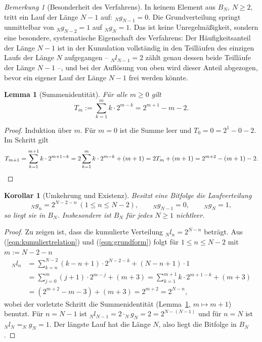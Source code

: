 \documentclass[11pt,a4paper]{scrartcl}
\theoremstyle{plain}
\newtheorem{lemma}[satz]{Lemma}
\newtheorem{korollar}[satz]{Korollar}
\theoremstyle{definition}
\theoremstyle{remark}
\newtheorem{bem}[satz]{Bemerkung}
\begin{document}
\begin{bem}[Besonderheit des Verfahrens]\label{bem:keinlaufnminus1}
In keinem Element aus $B_N$, $N\geq 2$, tritt ein Lauf der Länge $N-1$
auf: $_Ng_{N-1}=0$. Die Grundverteilung springt unmittelbar von
$_Ng_{N-2}=1$ auf $_Ng_N=1$. Das ist keine Unregelmäßigkeit, sondern
eine besondere, systematische Eigenschaft des Verfahrens: Der
Häufigkeitsanteil der Länge $N-1$ ist in der Kumulation vollständig in
den Teilläufen des einzigen Laufs der Länge $N$ aufgegangen --
$_Nl_{N-1}=2$ zählt genau dessen beide Teilläufe der Länge $N-1$ --,
und bei der Auflösung von oben wird dieser Anteil abgezogen, bevor ein
eigener Lauf der Länge $N-1$ frei werden könnte.
\end{bem}

\begin{lemma}[Summenidentität]\label{lem:summenidentitaet}
Für alle $m\geq 0$ gilt
\begin{equation}\label{eqn:summenidentitaet}
  T_m:=\sum_{k=1}^{m} k\cdot 2^{m-k}=2^{m+1}-m-2.
\end{equation}
\end{lemma}

\begin{proof}
Induktion über $m$. Für $m=0$ ist die Summe leer und
$T_0=0=2^{1}-0-2$. Im Schritt gilt
\begin{equation*}
  T_{m+1}=\sum_{k=1}^{m+1}k\cdot 2^{m+1-k}
  =2\sum_{k=1}^{m}k\cdot 2^{m-k}+(m+1)
  =2T_m+(m+1)
  =2^{m+2}-(m+1)-2.\qedhere
\end{equation*}
\end{proof}

\begin{korollar}[Umkehrung und Existenz]\label{kor:umkehrung}
Besitzt eine Bitfolge die Laufverteilung
\begin{equation}\label{eqn:grundform}
  _Ng_n=2^{N-2-n}\ (1\leq n\leq N-2),\qquad _Ng_{N-1}=0,\qquad _Ng_N=1,
\end{equation}
so liegt sie in $B_N$. Insbesondere ist $B_N$ für jedes $N\geq 1$
nichtleer.
\end{korollar}

\begin{proof}
Zu zeigen ist, dass die kumulierte Verteilung $_Nl_n=2^{N-n}$ beträgt.
Aus (\ref{eqn:kumuliertrelation}) und (\ref{eqn:grundform}) folgt für
$1\leq n\leq N-2$ mit $m:=N-2-n$
\begin{align*}
  _Nl_n&=\sum_{k=n}^{N-2}\left(k-n+1\right)\cdot 2^{N-2-k}
  +\left(N-n+1\right)\cdot 1\\
  &=\sum_{j=0}^{m}\left(j+1\right)\cdot 2^{m-j}+\left(m+3\right)
  =\sum_{k=1}^{m+1} k\cdot 2^{m+1-k}+\left(m+3\right)\\
  &=\left(2^{m+2}-m-3\right)+\left(m+3\right)=2^{m+2}=2^{N-n},
\end{align*}
wobei der vorletzte Schritt die Summenidentität
(Lemma~\ref{lem:summenidentitaet}, $m\mapsto m+1$) benutzt. Für
$n=N-1$ ist $_Nl_{N-1}=2\cdot _Ng_N=2=2^{N-(N-1)}$ und für $n=N$ ist
$_Nl_N=_Ng_N=1$. Der längste Lauf hat die Länge $N$, also liegt die
Bitfolge in $B_N$.
\end{proof}
\end{document}
